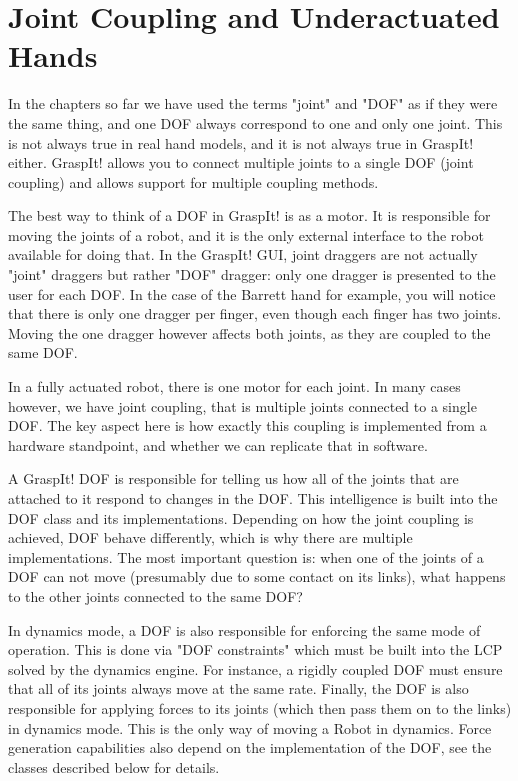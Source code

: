 \section{Joint Coupling and Underactuated Hands}
\label{sec:coupling}


In the chapters so far we have used the terms "joint" and "DOF" as if
they were the same thing, and one DOF always correspond to one and
only one joint. This is not always true in real hand models, and it is
not always true in GraspIt! either. GraspIt! allows you to connect
multiple joints to a single DOF (joint coupling) and allows support
for multiple coupling methods.

The best way to think of a DOF in GraspIt! is as a motor. It is
responsible for moving the joints of a robot, and it is the only
external interface to the robot available for doing that. In the
GraspIt! GUI, joint draggers are not actually "joint" draggers but
rather "DOF" dragger: only one dragger is presented to the user for
each DOF. In the case of the Barrett hand for example, you will notice
that there is only one dragger per finger, even though each finger has
two joints. Moving the one dragger however affects both joints, as
they are coupled to the same DOF.

In a fully actuated robot, there is one motor for each joint. In many
cases however, we have joint coupling, that is multiple joints
connected to a single DOF. The key aspect here is how exactly this
coupling is implemented from a hardware standpoint, and whether we can
replicate that in software.

A GraspIt! DOF is responsible for telling us how all of the joints
that are attached to it respond to changes in the DOF. This
intelligence is built into the DOF class and its
implementations. Depending on how the joint coupling is achieved, DOF
behave differently, which is why there are multiple
implementations. The most important question is: when one of the
joints of a DOF can not move (presumably due to some contact on its
links), what happens to the other joints connected to the same DOF?

In dynamics mode, a DOF is also responsible for enforcing the same
mode of operation. This is done via "DOF constraints" which must be
built into the LCP solved by the dynamics engine. For instance, a
rigidly coupled DOF must ensure that all of its joints always move at
the same rate. Finally, the DOF is also responsible for applying
forces to its joints (which then pass them on to the links) in
dynamics mode. This is the only way of moving a Robot in
dynamics. Force generation capabilities also depend on the
implementation of the DOF, see the classes described below for
details.

